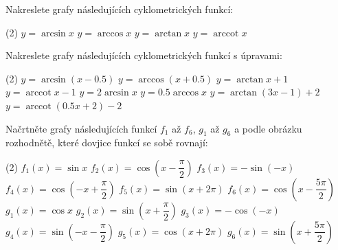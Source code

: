 \documentclass[12pt,a4paper]{article}
\DeclareMathOperator{\arccot}{arccot}
\begin{document}
\begin{exercise}
    Nakreslete grafy následujících cyklometrických funkcí:
    \begin{tasks}(2)
        \task $y = \arcsin x $
        \task $y = \arccos x $
        \task $y = \arctan x $
        \task $y = \arccot x $
    \end{tasks}
\end{exercise}


\newpage
\begin{exercise}
    Nakreslete grafy následujících cyklometrických funkcí s úpravami:
    \begin{tasks}(2)
        \task $y = \arcsin (x - 0.5) $
        \task $y = \arccos (x + 0.5) $
        \task $y = \arctan x + 1 $
        \task $y = \arccot x - 1 $
        \task $y = 2 \arcsin x $
        \task $y = 0.5 \arccos x $ 
        \task $y = \arctan(3x - 1) + 2 $
        \task $y = \arccot(0.5x + 2) - 2 $
    \end{tasks}
\end{exercise}

\begin{exercise}
    Načrtněte grafy následujících funkcí $f_1$ až $f_6$, $g_1$ až $g_6$ a podle obrázku rozhodnětě, které dovjice funkcí se sobě rovnají:
    \begin{tasks}(2)
        \task $f_1(x) = \sin x $
        \task $f_2(x) = \cos\left(x - \dfrac{\pi}{2}\right) $
        \task $f_3(x) = -\sin(-x) $
        \task $f_4(x) = \cos\left(-x + \dfrac{\pi}{2}\right) $
        \task $f_5(x) = \sin\left(x + 2\pi\right) $
        \task $f_6(x) = \cos\left(x - \dfrac{5\pi}{2}\right) $
        \task $g_1(x) = \cos x $
        \task $g_2(x) = \sin\left(x + \dfrac{\pi}{2}\right) $
        \task $g_3(x) = -\cos(-x) $
        \task $g_4(x) = \sin\left(-x - \dfrac{\pi}{2}\right) $
        \task $g_5(x) = \cos\left(x + 2\pi\right) $
        \task $g_6(x) = \sin\left(x + \dfrac{5\pi}{2}\right) $
    \end{tasks}
\end{exercise}
\end{document}
